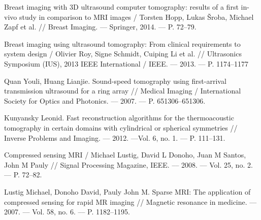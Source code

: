 \documentclass{spisok-article}
\begin{document}
\renewcommand\refname{Литература}
\begin{thebibliography}{8}

 Breast imaging with 3D ultrasound computer tomography: results of a first in-vivo study in comparison to MRI images / Torsten Hopp, Lukas Šroba, Michael Zapf et al. // Breast Imaging. –– Springer, 2014. –– P. 72–79.

 Breast imaging using ultrasound tomography: From clinical requirements to system design / Olivier Roy, Signe Schmidt, Cuiping Li et al. // Ultrasonics Symposium (IUS), 2013 IEEE International / IEEE. –– 2013. –– P. 1174–1177

 Quan Youli, Huang Lianjie. Sound-speed tomography using first-arrival transmission ultrasound for a ring array // Medical Imaging / International Society for Optics and Photonics. –– 2007. –– P. 651306–651306.

 Kunyansky Leonid. Fast reconstruction algorithms for the thermoacoustic tomography in certain domains with cylindrical or spherical symmetries // Inverse Problems and Imaging. –– 2012. ––Vol. 6, no. 1. –– P. 111–131.

 Compressed sensing MRI / Michael Lustig, David L Donoho, Juan M Santos, John M Pauly // Signal Processing Magazine, IEEE. –– 2008. –– Vol. 25, no. 2. –– P. 72–82.

  Lustig Michael, Donoho David, Pauly John M. Sparse MRI: The application of compressed sensing for rapid MR imaging // Magnetic resonance in medicine. –– 2007. –– Vol. 58, no. 6. –– P. 1182–1195.


\end{thebibliography}
\end{document}

